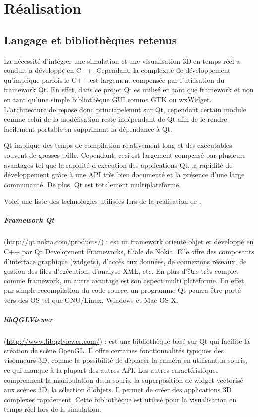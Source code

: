 \chapter{Réalisation}

\section{Langage et bibliothèques retenus}

La nécessité d'intégrer une simulation et une visualisation 3D en
temps réel a conduit a développé \NQ en C++. Cependant, la complexité
de développement qu'implique parfois le C++ est largement compensée
par l'utilisation du framework Qt. En effet, dans ce projet Qt es
utilisé en tant que framework et non en tant qu'une simple
bibliothèque GUI comme GTK ou wxWidget. L'architecture de \NQ repose
donc princiapelemnt sur Qt, cependant certain module comme celui de la
modélisation reste indépendant de Qt afin de le rendre facilement
portable en supprimant la dépendance à Qt.

Qt implique des temps de compilation relativement long et des
executables souvent de grosses taille. Cependant, ceci est largement
compensé par plusieurs avantages tel que la rapidité d'execution des
applications Qt, la rapidité de développement grâce à une API très
bien documenté et la présence d'une large communauté. De plus, Qt est
totalement multiplateforme.

Voici une liste des technologies utilisées lors de la réalisation de \NQ.

\paragraph{Framework Qt}(\url{http://qt.nokia.com/products/}) : est
un framework orienté objet et développé en C++ par Qt Development
Frameworks, filiale de Nokia. Elle offre des composants d'interface
graphique (widgets), d'accès aux données, de connexions réseaux, de
gestion des files d'exécution, d'analyse XML, etc. En plus d'être très
complet comme framework, un autre avantage est son aspect multi
plateforme. En effet, par simple recompilation du code source, un
programme Qt pourra être porté vers des OS tel que GNU/Linux, Windows
et Mac OS X.

\paragraph{libQGLViewer}(\url{http://www.libqglviewer.com/}) : est une
bibliothèque basé sur Qt qui facilite la création de scène OpenGL.  Il
offre certaines fonctionnalités typiques des visonneurs 3D, comme la
possibilité de déplacer la caméra en utilisant la souris, ce qui
manque à la plupart des autres API. Les autres caractéristiques
comprennent la manipulation de la souris, la superposition de widget
vectorisé aux scènes 3D, la sélection d'objets. Il permet de créer des
applications 3D complexes rapidement. Cette bibliothèque est utilisé
pour la visualisation en temps réel lors de la simulation.

